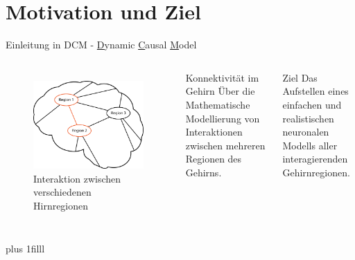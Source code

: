 \documentclass{beamer}
\begin{document}
\section{Motivation und Ziel}
	\begin{frame}{Einleitung in DCM - \underline{D}ynamic \underline{C}ausal \underline{M}odel}
		\begin{columns}
		\column[t]{6cm}
		\begin{figure}
			\centering
			\includegraphics[width=0.85\linewidth]{res/brain_01.eps}
			\\ Interaktion zwischen\\ verschiedenen Hirnregionen
			\label{fig:brain_01}
		\end{figure}
		\column[t]{6cm}
		\begin{block}{\centering Konnektivität im Gehirn}
			\centering
			Über die Mathematische Modellierung von Interaktionen zwischen mehreren Regionen des Gehirns.
		\end{block}
		\vspace{0.5cm}
		\begin{exampleblock}{\centering Ziel}
			 \centering
			 Das Aufstellen eines einfachen und realistischen neuronalen Modells aller interagierenden Gehirnregionen.
		\end{exampleblock}
		\end{columns}
		\vskip0pt plus 1filll
	\end{frame}
	
\end{document}
